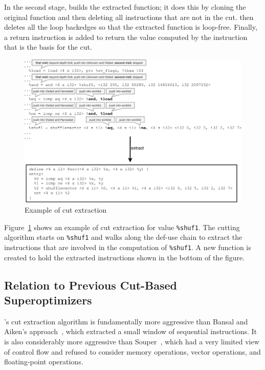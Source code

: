 In the second stage, \minotaur{} builds the extracted function; it does
this by cloning the original function and then deleting all
instructions that are not in the cut.
%
\minotaur{} then deletes all the loop backedges so that the extracted
function is loop-free.
%
Finally, a return instruction is added to return the value computed by
the instruction that is the basis for the cut.

\begin{figure}[tbp]
  \centering
  \includegraphics[width=\linewidth]{figures/slice.pdf}
  \caption{Example of cut extraction}
  \label{fig:cut}
\end{figure}


Figure~\ref{fig:cut} shows an example of cut extraction
for value \texttt{\%shuf1}.
%
The cutting algorithm starts on \texttt{\%shuf1} and walks along the
def-use chain to extract the instructions that are involved in the
computation of \texttt{\%shuf1}.
%
A new function is created to hold the extracted instructions shown
in the bottom of the figure.



\subsection{Relation to Previous Cut-Based Superoptimizers}

\minotaur's cut extraction algorithm is fundamentally more aggressive
than Bansal and Aiken's approach~\cite{Bansal06}, which extracted a
small window of sequential instructions.
%
It is also considerably more aggressive than Souper~\cite{souper},
which had a very limited view of control flow and refused to consider
memory operations, vector operations, and floating-point operations.